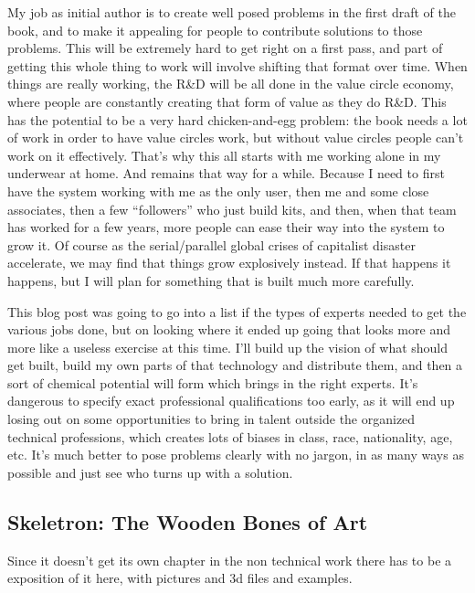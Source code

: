My job as initial author is to create well posed problems in the first
draft of the book, and to make it appealing for people to contribute
solutions to those problems. This will be extremely hard to get right on
a first pass, and part of getting this whole thing to work will involve
shifting that format over time. When things are really working, the R\&D
will be all done in the value circle economy, where people are
constantly creating that form of value as they do R\&D. This has the
potential to be a very hard chicken-and-egg problem: the book needs a
lot of work in order to have value circles work, but without value
circles people can't work on it effectively. That's why this all starts
with me working alone in my underwear at home. And remains that way for
a while. Because I need to first have the system working with me as the
only user, then me and some close associates, then a few ``followers''
who just build kits, and then, when that team has worked for a few
years, more people can ease their way into the system to grow it. Of
course as the serial/parallel global crises of capitalist disaster
accelerate, we may find that things grow explosively instead. If that
happens it happens, but I will plan for something that is built much
more carefully.

This blog post was going to go into a list if the types of experts
needed to get the various jobs done, but on looking where it ended up
going that looks more and more like a useless exercise at this time.
I'll build up the vision of what should get built, build my own parts of
that technology and distribute them, and then a sort of chemical
potential will form which brings in the right experts. It's dangerous to
specify exact professional qualifications too early, as it will end up
losing out on some opportunities to bring in talent outside the
organized technical professions, which creates lots of biases in class,
race, nationality, age, etc. It's much better to pose problems clearly
with no jargon, in as many ways as possible and just see who turns up
with a solution.

\subsection{Skeletron: The Wooden Bones of
Art}\label{skeletron-the-wooden-bones-of-art}

Since it doesn't get its own chapter in the non technical work there has
to be a exposition of it here, with pictures and 3d files and examples.
